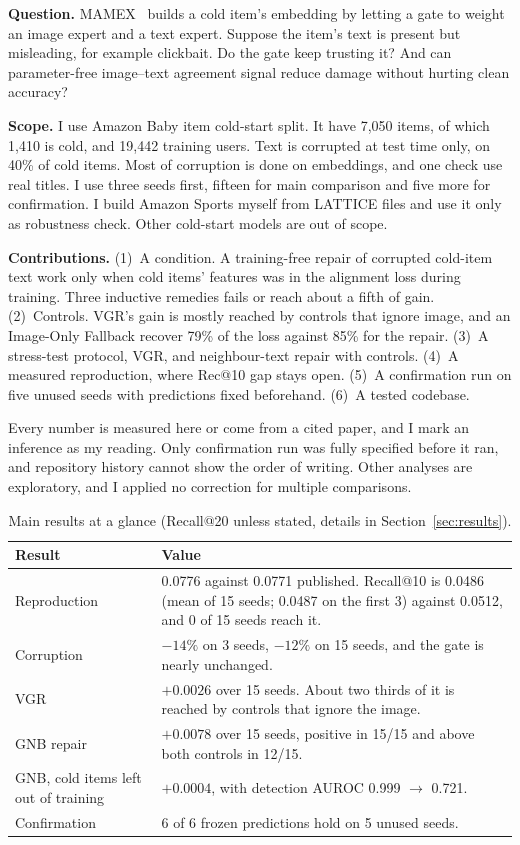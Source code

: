 \documentclass[conference]{IEEEtran}
\begin{document}
\textbf{Question.} MAMEX~\cite{nguyen2025mamex} builds a cold item's embedding by letting a gate to weight an image expert and a text expert. Suppose the item's text is present but misleading, for example clickbait. Do the gate keep trusting it? And can parameter-free image--text agreement signal reduce damage without hurting clean accuracy?

\textbf{Scope.} I use Amazon Baby item cold-start split. It have 7,050 items, of which 1,410 is cold, and 19,442 training users. Text is corrupted at test time only, on 40\% of cold items. Most of corruption is done on embeddings, and one check use real titles. I use three seeds first, fifteen for main comparison and five more for confirmation. I build Amazon Sports myself from LATTICE files and use it only as robustness check. Other cold-start models are out of scope.

\textbf{Contributions.} (1)~A condition. A training-free repair of corrupted cold-item text work only when cold items' features was in the alignment loss during training. Three inductive remedies fails or reach about a fifth of gain. (2)~Controls. VGR's gain is mostly reached by controls that ignore image, and an Image-Only Fallback recover 79\% of the loss against 85\% for the repair. (3)~A stress-test protocol, VGR, and neighbour-text repair with controls. (4)~A measured reproduction, where Rec@10 gap stays open. (5)~A confirmation run on five unused seeds with predictions fixed beforehand. (6)~A tested codebase.

Every number is measured here or come from a cited paper, and I mark an inference as my reading. Only confirmation run was fully specified before it ran, and repository history cannot show the order of writing. Other analyses are exploratory, and I applied no correction for multiple comparisons.

\begin{table}[!t]
\centering\footnotesize
\caption{Main results at a glance (Recall@20 unless stated, details in Section~\ref{sec:results}).}
\label{tab:glance}
\begin{tabularx}{\columnwidth}{@{}>{\raggedright\arraybackslash}p{2.4cm}X@{}}
\toprule
Result & Value \\
\midrule
Reproduction & 0.0776 against 0.0771 published. Recall@10 is 0.0486 (mean of 15 seeds; 0.0487 on the first 3) against 0.0512, and 0 of 15 seeds reach it. \\
Corruption & $-14\%$ on 3 seeds, $-12\%$ on 15 seeds, and the gate is nearly unchanged. \\
VGR & $+0.0026$ over 15 seeds. About two thirds of it is reached by controls that ignore the image. \\
GNB repair & $+0.0078$ over 15 seeds, positive in 15/15 and above both controls in 12/15. \\
GNB, cold items left out of training & $+0.0004$, with detection AUROC 0.999 $\to$ 0.721. \\
Confirmation & 6 of 6 frozen predictions hold on 5 unused seeds. \\
\bottomrule
\end{tabularx}
\end{table}
\end{document}
